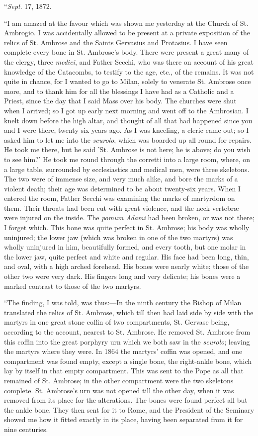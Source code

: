 ``\emph{Sept}. 17, 1872.

``I am amazed at the favour which was shown me yesterday at the
Church of St. Ambrogio. I was accidentally allowed to be present at a
private exposition of the relics of St. Ambrose and the Saints
Gervasius and Protasius. I have seen complete every bone in St.
Ambrose's body. There were present a great many of the clergy, three \emph{medici},
and Father Secchi, who was there on account of his great knowledge of
the Catacombs, to testify to the age, etc., of the remains. It was not
quite in chance, for I wanted to go to Milan, solely to venerate St.
Ambrose once more, and to thank him for all the blessings I have had
as a Catholic and a Priest, since the day that I said Mass over his
body. The churches were shut when I arrived; so I got up early next
morning and went off to the Ambrosian. I knelt down before the high
altar, and thought of all that had happened since you and I were
there, twenty-six years ago. As I was kneeling, a cleric came out; so
I asked him to let me into the \emph{scurolo}, which was boarded up
all round for repairs. He took me there, but he said 'St. Ambrose is
not here; he is above; do you wish to see him?' He took me round
through the corretti into a large room, where, on a large table,
surrounded by ecclesiastics and medical men, were three skeletons. The
two were of immense size, and very much alike, and bore the marks of a
violent death; their age was determined to be about twenty-six years.
When I entered the room, Father Secchi was examining the marks of
martyrdom on them. Their throats had been cut with great violence, and
the neck vertebræ
were injured on the inside. The \emph{pomum Adami} had been broken, or
was not there; I forget which. This bone was quite perfect in St.
Ambrose; his body was wholly uninjured; the lower jaw (which was
broken in one of the two martyrs) was wholly uninjured in him,
beautifully formed, and every tooth, but one molar in the lower jaw,
quite perfect and white and regular. His face had been long, thin, and
oval, with a high arched forehead. His bones were nearly white; those
of the other two were very dark. His fingers long and very delicate;
his bones were a marked contrast to those of the two martyrs.

``The finding, I was told, was thus:—In the ninth century the
Bishop of Milan translated the relics of St. Ambrose, which till then
had laid side by side with the martyrs in one great stone coffin of
two compartments, St. Gervase being, according to the account, nearest
to St. Ambrose. He removed St. Ambrose from this coffin into the great
porphyry urn which we both saw in the \emph{scurolo}; leaving the
martyrs where they were. In 1864 the martyrs' coffin was opened, and
one compartment was found empty, except a single bone, the right-ankle
bone, which lay by itself in that empty compartment. This was sent to
the Pope as all that remained of St. Ambrose; in the other compartment
were the two skeletons complete. St. Ambrose's urn was not opened till
the other day, when it was removed from its place for the alterations.
The bones were found perfect all but the ankle bone. They then sent
for it to Rome, and the President of the Seminary showed me how it
fitted exactly in its place, having been separated from it for nine
centuries.

